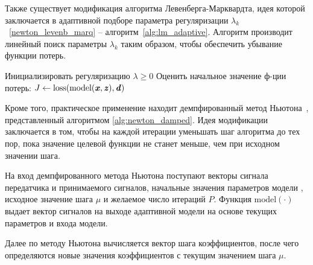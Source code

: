 Также существует модификация алгоритма Левенберга-Марквардта, идея которой заключается в адаптивной подборе параметра регуляризации $\lambda_k$~\eqref{newton_levenb_marq} -- алгоритм~\ref{alg:lm_adaptive}. Алгоритм производит линейный поиск параметры $\lambda_k$ таким образом, чтобы обеспечить убывание функции потерь.
\begin{algorithm}[h!]
	\SetAlgoLined
	\BlankLine
	Инициализировать регуляризацию $\lambda \geq 0$\;
	Оценить начальное значение ф-ции потерь: $J \gets \text{loss}(\text{model}(\textbf{\textit{x}}, \textbf{\textit{z}}), \textbf{\textit{d}})$\;
	\caption{Метод Ньютона с адаптивной регуляризацией на основе алгоритма Левенберга-Марквардта}
	\label{alg:lm_adaptive}
\end{algorithm}

Кроме того, практическое применение находит демпфированный метод Ньютона~\cite{nesterov}, представленный алгоритмом \ref{alg:newton_damped}. Идея модификации заключается в том, чтобы на каждой итерации уменьшать шаг алгоритма до тех пор, пока значение целевой функции не станет меньше, чем при исходном значении шага. 

На вход демпфированного метода Ньютона поступают векторы сигнала передатчика  и принимаемого  сигналов, начальные значения параметров модели , исходное значение шага $\mu$ и желаемое число итераций $P$. Функция $\text{model}(\cdot)$ выдает вектор сигналов на выходе адаптивной модели на основе текущих параметров и входа модели.

Далее по методу Ньютона вычисляется вектор шага коэффициентов, после чего определяются новые значения коэффициентов с текущим значением шага $\mu$. 


